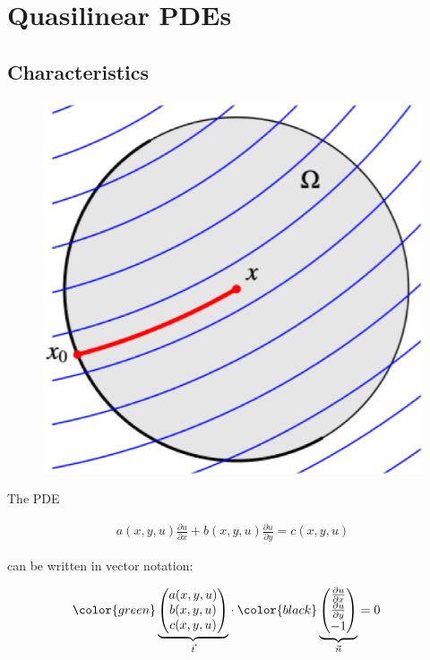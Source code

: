 \section{Quasilinear PDEs}\label{sec:quasilinear-pdes}

\subsection{Characteristics}\label{subsec:characteristics}

\begin{figure}
    \centering
    \includegraphics[width=0.4\columnwidth]{images/quasilinear}
\end{figure}

The PDE

\begin{align*}
    a(x,y,u)\frac{\partial u}{\partial x}+b(x,y,u)\frac{\partial u}{\partial y} = c(x,y,u)
\end{align*}

can be written in vector notation:

\begin{align*}
{\color{green}
\underbrace{
    \begin{pmatrix}
        a(x,y,u) \\
        b(x,y,u) \\
        c(x,y,u)
    \end{pmatrix}
}_{\vec t}
}
    \cdot
    {\color{black}
    \underbrace{
        \begin{pmatrix}
            \frac{\partial u}{\partial x} \\
            \frac{\partial u}{\partial y} \\
            -1
        \end{pmatrix}
    }_{\vec{n}}
    }
    &= 0
\end{align*}

